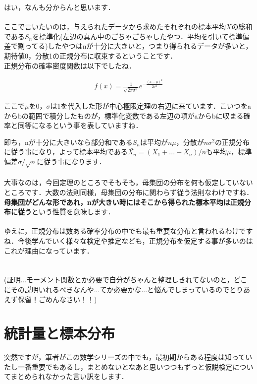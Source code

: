 \documentclass[11pt,a4paper]{ujreport} 	%
\begin{document}
はい，なんも分からんと思います．\\
\\

ここで言いたいのは，与えられたデータから求めたそれぞれの標本平均$X$の総和である$S_n$を標準化(左辺の真ん中のごちゃごちゃしたやつ．平均を引いて標準偏差で割ってる)したやつはnが十分に大きいと，つまり得られるデータが多いと，期待値0，分散1の正規分布に収束するということです．\\

正規分布の確率密度関数は以下でしたね．

\begin{align}
  f(x) = \frac{1}{\sqrt{2\pi\sigma^2}}e^{-\frac{(x-\mu)^2}{2\sigma^2}}
\end{align}

ここで$\mu$を0，$\sigma$は1を代入した形が中心極限定理の右辺に来ています．こいつをaからbの範囲で積分したものが，標準化変数である左辺の項がaからbに収まる確率と同等になるという事を表していますね．

即ち，nが十分に大きいなら部分和である$S_n$は平均が$n\mu$，分散が$n\sigma^2$の正規分布に従う事になり，よって標本平均である$\bar{X_n}=(X_1+...+X_n)/n$も平均$\mu$，標準偏差$\sigma/\sqrt{n}$に従う事になります．\\
\\

大事なのは，今回定理のところでそもそも，母集団の分布を何も仮定していないところです．大数の法則同様，母集団の分布に関わらず従う法則なわけですね．\\

\textbf{母集団がどんな形であれ，nが大きい時にはそこから得られた標本平均は正規分布に従う}という性質を意味します．\\
\\

ゆえに，正規分布は数ある確率分布の中でも最も重要な分布と言われるわけですね．今後学んでいく様々な検定や推定なども，正規分布を仮定する事が多いのはこれが理由になっています．\\
\\
\\

(証明...モーメント関数とか必要で自分がちゃんと整理しきれてないのと，どこにその説明いれるべきなんや...てか必要かな...と悩んでしまっているのでとりあえず保留！ごめんなさい！！)


\chapter{統計量と標本分布}
突然ですが，筆者がこの数学シリーズの中でも，最初期からある程度は知っていたし一番重要でもあるし，まとめないとなあと思いつつもずっと仮説検定についてまとめられなかった言い訳をします．\\
\\
\end{document}
